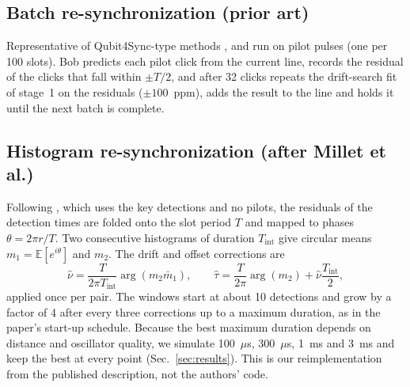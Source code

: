 \documentclass[journal]{IEEEtran}
\theoremstyle{plain}
\newcommand{\E}{\mathbb{E}}
\begin{document}
\subsection{Batch re-synchronization (prior art)}
Representative of Qubit4Sync-type methods \cite{calderaro2020,cochran2021}, and run on pilot pulses (one per 100 slots). Bob predicts each pilot click from the current line, records the residual of the clicks that fall within $\pm T/2$, and after 32 clicks repeats the drift-search fit of stage~1 on the residuals ($\pm100$~ppm), adds the result to the line and holds it until the next batch is complete.

\subsection{Histogram re-synchronization (after Millet et al.)}
Following \cite{millet2026}, which uses the key detections and no pilots, the residuals of the detection times are folded onto the slot period $T$ and mapped to phases $\theta=2\pi r/T$. Two consecutive histograms of duration $T_{\mathrm{int}}$ give circular means $m_1=\E[e^{i\theta}]$ and $m_2$. The drift and offset corrections are
\begin{equation}
\hat\nu=\frac{T}{2\pi T_{\mathrm{int}}}\arg(m_2\bar m_1),\qquad
\hat\tau=\frac{T}{2\pi}\arg(m_2)+\hat\nu\frac{T_{\mathrm{int}}}{2},
\end{equation}
applied once per pair. The windows start at about 10 detections and grow by a factor of 4 after every three corrections up to a maximum duration, as in the paper's start-up schedule. Because the best maximum duration depends on distance and oscillator quality, we simulate 100~$\mu$s, 300~$\mu$s, 1~ms and 3~ms and keep the best at every point (Sec.~\ref{sec:results}). This is our reimplementation from the published description, not the authors' code.
\end{document}
